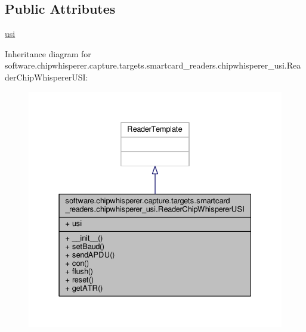 \subsection*{Public Attributes}
\begin{DoxyCompactItemize}
\item 
\hyperlink{classsoftware_1_1chipwhisperer_1_1capture_1_1targets_1_1smartcard__readers_1_1chipwhisperer__usi_1_1ReaderChipWhispererUSI_a53b8f716a52ef6f2bb55b3e055b94c63}{usi}
\end{DoxyCompactItemize}


Inheritance diagram for software.\+chipwhisperer.\+capture.\+targets.\+smartcard\+\_\+readers.\+chipwhisperer\+\_\+usi.\+Reader\+Chip\+Whisperer\+U\+S\+I\+:\nopagebreak
\begin{figure}[H]
\begin{center}
\leavevmode
\includegraphics[width=331pt]{d0/d50/classsoftware_1_1chipwhisperer_1_1capture_1_1targets_1_1smartcard__readers_1_1chipwhisperer__usifcf117b6f0c7935888ec993e79e9d649}
\end{center}
\end{figure}


